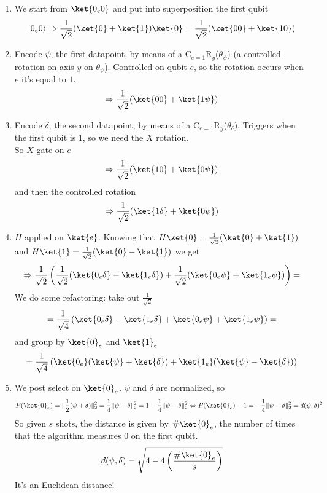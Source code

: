 \documentclass[10pt]{report}
\begin{document}
\begin{enumerate}
	\item We start from $\ket{0_e0}$ and put into superposition the first qubit
	$$|0_e0\rangle \Rightarrow \frac{1}{\sqrt{2}}(\ket{0}+\ket{1})\ket{0} = \frac{1}{\sqrt{2}}(\ket{00}+\ket{10})$$
	\item Encode $\psi$, the first datapoint, by means of a C$_{e=1}$R$_y$($\theta_\psi$) (a controlled rotation on axis $y$ on $\theta_\psi$). Controlled on qubit $e$, so the rotation occurs when $e$ it's equal to $1$.
	$$\Rightarrow \frac{1}{\sqrt{2}}(\ket{00}+\ket{1\psi})$$
	\item Encode $\delta$, the second datapoint, by means of a C$_{e=1}$R$_y$($\theta_\delta$). Triggers when the first qubit is $1$, so we need the $X$ rotation.\\
	So $X$ gate on $e$
	$$\Rightarrow \frac{1}{\sqrt{2}}(\ket{10}+\ket{0\psi})$$
	and then the controlled rotation
	$$\Rightarrow \frac{1}{\sqrt{2}}(\ket{1\delta}+\ket{0\psi})$$
	\item $H$ applied on $\ket{e}$. Knowing that $H\ket{0} = \frac{1}{\sqrt{2}}(\ket{0} + \ket{1})$ and $H\ket{1} = \frac{1}{\sqrt{2}}(\ket{0} - \ket{1})$ we get
	$$\Rightarrow \frac{1}{\sqrt{2}}\left(\frac{1}{\sqrt{2}}(\ket{0_e\delta}-\ket{1_e\delta})+\frac{1}{\sqrt{2}}(\ket{0_e\psi} + \ket{1_e\psi})\right) =$$
	We do some refactoring: take out $\frac{1}{\sqrt{2}}$
	$$= \frac{1}{\sqrt{4}}\left(\ket{0_e\delta}-\ket{1_e\delta} + \ket{0_e\psi} + \ket{1_e\psi}\right) =$$
	and group by $\ket{0}_e$ and $\ket{1}_e$
	$$= \frac{1}{\sqrt{4}}\left(\ket{0_e}(\ket{\psi}+\ket{\delta}) + \ket{1_e}(\ket{\psi}-\ket{\delta})\right)$$
	\item We post select on $\ket{0}_e$. $\psi$ and $\delta$ are normalized, so
	$$P(\ket{0}_e) = \|\frac{1}{2}(\psi+\delta)\|_2^2 = \frac{1}{4}\|\psi + \delta\|_2^2  = 1-\frac{1}{4}\|\psi-\delta\|_2^2 \Leftrightarrow P(\ket{0}_e)-1 = -\frac{1}{4}\|\psi-\delta\|_2^2 = d(\psi, \delta)^2$$
	So given $s$ shots, the distance is given by $\#\ket{0}_e$, the number of times that the algorithm measures $0$ on the first qubit.
	$$d(\psi,\delta) = \sqrt{4- 4\left(\frac{\#\ket{0}_e}{s}\right)}$$
	It's an Euclidean distance!
\end{enumerate}
\end{document}
